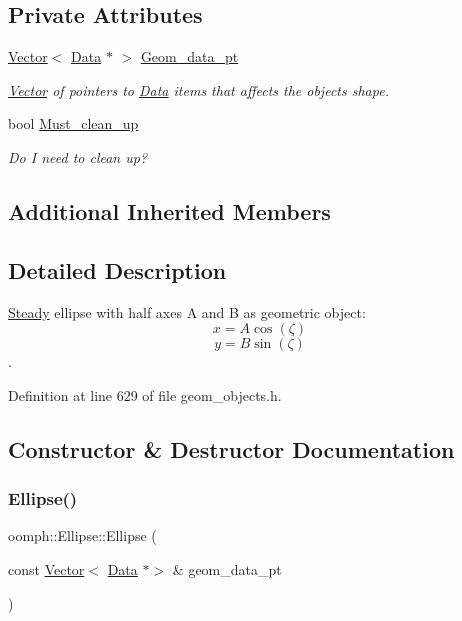\subsection*{Private Attributes}
\begin{DoxyCompactItemize}
\item 
\hyperlink{classoomph_1_1Vector}{Vector}$<$ \hyperlink{classoomph_1_1Data}{Data} $\ast$ $>$ \hyperlink{classoomph_1_1Ellipse_ae46cd009a73386dc3423378d8a0065de}{Geom\+\_\+data\+\_\+pt}
\begin{DoxyCompactList}\small\item\em \hyperlink{classoomph_1_1Vector}{Vector} of pointers to \hyperlink{classoomph_1_1Data}{Data} items that affects the object\textquotesingle{}s shape. \end{DoxyCompactList}\item 
bool \hyperlink{classoomph_1_1Ellipse_ad21b2c34858b46d6bff5f25f02bbe3d9}{Must\+\_\+clean\+\_\+up}
\begin{DoxyCompactList}\small\item\em Do I need to clean up? \end{DoxyCompactList}\end{DoxyCompactItemize}
\subsection*{Additional Inherited Members}


\subsection{Detailed Description}
\hyperlink{classoomph_1_1Steady}{Steady} ellipse with half axes A and B as geometric object\+: \[ x = A \cos(\zeta) \] \[ y = B \sin(\zeta) \]. 

Definition at line 629 of file geom\+\_\+objects.\+h.



\subsection{Constructor \& Destructor Documentation}
\mbox{\label{classoomph_1_1Ellipse_a6fa5158011b34942ea014f8106e86786}} 
\subsubsection{\texorpdfstring{Ellipse()}{Ellipse()}\hspace{0.1cm}{\footnotesize\ttfamily [1/3]}}
{\footnotesize\ttfamily oomph\+::\+Ellipse\+::\+Ellipse (\begin{DoxyParamCaption}\item[{const \hyperlink{classoomph_1_1Vector}{Vector}$<$ \hyperlink{classoomph_1_1Data}{Data} $\ast$$>$ \&}]{geom\+\_\+data\+\_\+pt }\end{DoxyParamCaption})\hspace{0.3cm}{\ttfamily [inline]}}



